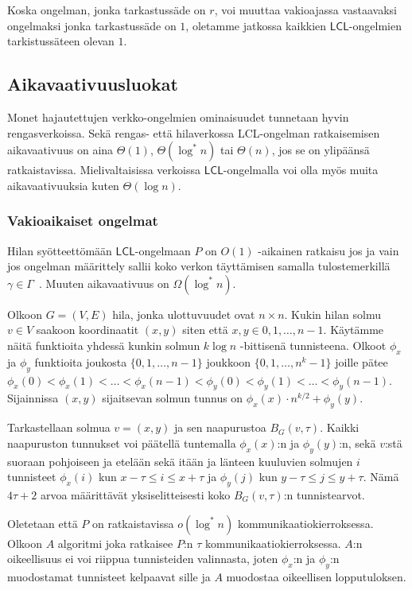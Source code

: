 \documentclass[12pt,finnish]{tktltiki2}
\theoremstyle{definition}
\theoremstyle{remark}
\newcommand*{\lcl}{\ensuremath{\mathsf{LCL}}}
\begin{document}
Koska ongelman, jonka tarkastussäde on $r$, voi muuttaa vakioajassa vastaavaksi ongelmaksi jonka tarkastussäde on $1$, oletamme jatkossa kaikkien \lcl -ongelmien tarkistussäteen olevan $1$.

\subsection{Aikavaativuusluokat}
Monet hajautettujen verkko-ongelmien ominaisuudet tunnetaan hyvin rengasverkoissa. Sekä rengas- että hilaverkossa LCL-ongelman ratkaisemisen aikavaativuus on aina $\Theta(1)$, $\Theta (\log^* n)$ tai $\Theta(n)$, jos se on ylipäänsä ratkaistavissa. Mielivaltaisissa verkoissa \lcl -ongelmalla voi olla myös muita aikavaativuuksia kuten $\Theta(\log n)$.

\subsubsection{Vakioaikaiset ongelmat}

Hilan syötteettömään \lcl -ongelmaan $P$ on $O(1)$ -aikainen ratkaisu jos ja vain jos ongelman määrittely sallii koko verkon täyttämisen samalla tulostemerkillä $\gamma \in \Gamma$~\cite{chang}. Muuten aikavaativuus on $\Omega(\log^* n)$.

Olkoon $G = (V, E)$ hila, jonka ulottuvuudet ovat $n \times n$. Kukin hilan solmu $v \in V$ saakoon koordinaatit $(x, y)$ siten että $x, y \in {0, 1, \dots, n-1}$. Käytämme näitä funktioita yhdessä kunkin solmun $k \log n$ -bittisenä tunnisteena. Olkoot $\phi_x$ ja $\phi_y$ funktioita joukosta $\{0, 1,\dots, n-1\}$ joukkoon $\{0, 1,\dots,n^k-1\}$ joille pätee $\phi_x(0) < \phi_x(1) < \dots < \phi_x(n-1) < \phi_y(0) < \phi_y(1) < \dots < \phi_y(n-1)$. Sijainnissa $(x, y)$ sijaitsevan solmun tunnus on $\phi_x(x) \cdot n^{k/2} + \phi_y(y)$.

Tarkastellaan solmua $v = (x, y)$ ja sen naapurustoa $B_G(v, \tau)$. Kaikki naapuruston tunnukset voi päätellä tuntemalla $\phi_x(x)$:n ja $\phi_y(y)$:n, sekä $v$:stä suoraan pohjoiseen ja etelään sekä itään ja länteen kuuluvien solmujen $i$ tunnisteet $\phi_x(i)$ kun $x - \tau \leq i \leq x + \tau$ ja $\phi_y(j)$ kun $y - \tau \leq j \leq y + \tau$. Nämä $4\tau + 2$ arvoa määrittävät yksiselitteisesti koko $B_G(v, \tau)$:n tunnistearvot.

Oletetaan että $P$ on ratkaistavissa $o(\log^* n)$ kommunikaatiokierroksessa. Olkoon $A$ algoritmi joka ratkaisee $P$:n $\tau$ kommunikaatiokierroksessa. $A$:n oikeellisuus ei voi riippua tunnisteiden valinnasta, joten $\phi_x$:n ja $\phi_y$:n muodostamat tunnisteet kelpaavat sille ja $A$ muodostaa oikeellisen lopputuloksen.
\end{document}
